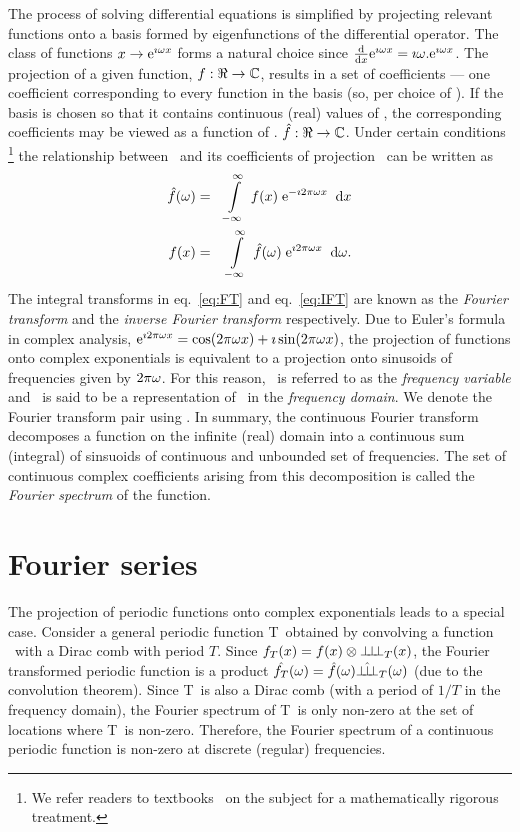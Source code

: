 The process of solving differential equations is simplified by projecting relevant functions onto a basis formed by eigenfunctions of the differential operator. The class of functions $x \rightarrow \mathrm{e}^{\mathrm{\imath} \omega x}$ forms a natural choice since $\frac {\mathrm{d}}{\mathrm{d}x} \mathrm{e}^{\mathrm{\imath} \omega x} = \mathrm{\imath} \omega . \mathrm{e}^{\mathrm{\imath} \omega x}$. The projection of a given function, $f: \Re \rightarrow \mathbb{C}$, results in a set of coefficients --- one coefficient corresponding to every function in the basis (so, per choice of \fvn). If the basis is chosen so that it contains continuous (real) values of \fv, the corresponding coefficients may be viewed as a function of \fv. $\hat{f}: \Re\rightarrow\mathbb{C}$. Under certain conditions
\footnote{
We refer readers to textbooks~\cite{bracewell00fourier,kammlerFourier} on the subject for a mathematically rigorous treatment.
}
 the relationship between \ifn\ 
and its coefficients of projection \IFn\ can be written as 
\begin{eqnarray}
 \label{eq:FT} \hat{f}(\omega) & = & \displaystyle\int\limits_{-\infty}^{\infty} \; f(x) \; \mathrm{e}^{- \mathrm{\imath} 2\pi \omega x} \;\; \mathrm{d}x  \\
 \label{eq:IFT} f(x) & = & \displaystyle\int\limits_{-\infty}^{\infty} \; \hat{f}(\omega) \; \mathrm{e}^{ \mathrm{\imath} 2\pi \omega x} \;\; \mathrm{d}\omega.
\end{eqnarray}
The integral transforms in eq.~\ref{eq:FT} and eq.~\ref{eq:IFT} are known as the \textit{Fourier transform} and the \textit{inverse Fourier transform} respectively. Due to Euler's formula in complex analysis,  $\mathrm{e}^{\mathrm{\imath} 2\pi \omega x} = \cos({2\pi\omega x}) + \mathrm{\imath} \sin({2\pi\omega x})$, the projection of functions onto complex exponentials is equivalent to a projection onto sinusoids of frequencies given by $2\pi\omega$. For this reason, \fv\ is referred to as the \textit{frequency variable} and \IFn\ is said to be a representation of \ifn\ in the \textit{frequency domain}. We denote the Fourier transform pair using \ifn \Fdual \IFn. In summary, the continuous Fourier transform decomposes a function on the infinite (real) domain into a continuous sum (integral) of sinsuoids of continuous and unbounded set of frequencies. The set of continuous complex coefficients arising from this decomposition is called the \textit{Fourier spectrum} of the function. 

\section{Fourier series} \label{sec:PFT}
The projection of periodic functions onto complex exponentials leads to a special case. Consider a general periodic function \ipn T\ obtained by convolving a function \ifn\ with a Dirac comb  with period $T$. Since $f_{T}(x) = f(x)  \otimes {\bot\hspace{-.7ex}\bot\hspace{-.7ex}\bot}_{T}(x)$, the Fourier transformed periodic function is a product $\hat{f_{T}}(\omega) = \hat{f}(\omega) \hat{{\bot\hspace{-.8ex}\bot\hspace{-.8ex}\bot}}_{T}(\omega)$ (due to the convolution theorem). Since \SHAF T\ is also a Dirac comb (with a period of $1/T$ in the frequency domain), the Fourier spectrum of \ipn T\ is only non-zero at the set of locations where \SHAF T\ is non-zero. Therefore, the Fourier spectrum of a continuous periodic function is non-zero at discrete (regular) frequencies.

